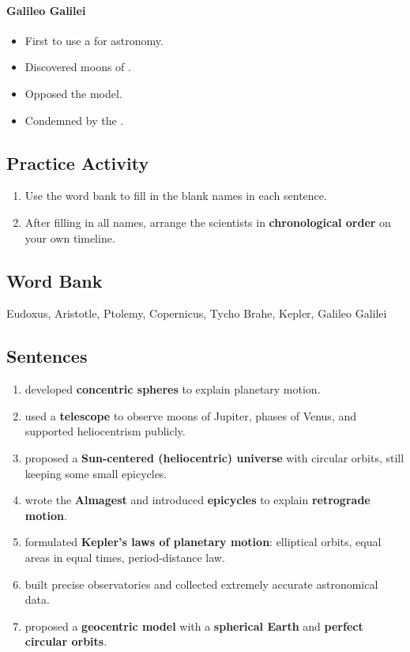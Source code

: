 \documentclass[12pt]{article}
\newcommand{\fillin}[1]{\uline{\hspace{#1}}}
\begin{document}
\paragraph{Galileo Galilei}
\begin{itemize}
  \item First to use a \fillin{3cm} for astronomy.
  \item Discovered moons of \fillin{3cm}.
  \item Opposed the \fillin{3cm} model.
  \item Condemned by the \fillin{4cm}.
\end{itemize}

\subsection*{Practice Activity}
\begin{enumerate}
    \item Use the word bank to fill in the blank names in each sentence.
    \item After filling in all names, arrange the scientists in \textbf{chronological order} on your own timeline.
\end{enumerate}

\subsection*{Word Bank}
Eudoxus, Aristotle, Ptolemy, Copernicus, Tycho Brahe, Kepler, Galileo Galilei

\subsection*{Sentences}
\begin{enumerate}
    \item \fillin{3cm} developed \textbf{concentric spheres} to explain planetary motion.
    \item \fillin{3cm} used a \textbf{telescope} to observe moons of Jupiter, phases of Venus, and supported heliocentrism publicly.
    \item \fillin{3cm} proposed a \textbf{Sun-centered (heliocentric) universe} with circular orbits, still keeping some small epicycles.
    \item \fillin{3cm} wrote the \textbf{Almagest} and introduced \textbf{epicycles} to explain \textbf{retrograde motion}.
    \item \fillin{3cm} formulated \textbf{Kepler's laws of planetary motion}: elliptical orbits, equal areas in equal times, period-distance law.
    \item \fillin{3cm} built precise observatories and collected extremely accurate astronomical data.
    \item \fillin{3cm} proposed a \textbf{geocentric model} with a \textbf{spherical Earth} and \textbf{perfect circular orbits}.
\end{enumerate}
\end{document}
